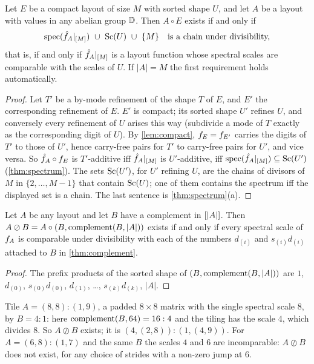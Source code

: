 \begin{theorem}\label{thm:division}
Let $E$ be a compact layout of size $M$ with sorted shape $U$, and let $A$ be a layout with values
in any abelian group $\mathbb{D}$. Then $A\circ E$ exists if and only if
\[ \operatorname{spec}(\hat{f}_{A}|_{[M]})\ \cup\ \operatorname{Sc}(U)\ \cup\ \{M\}\quad\text{is a chain under divisibility,} \]
that is, if and only if $\hat{f}_{A}|_{[M]}$ is a layout function whose spectral scales are
comparable with the scales of $U$. If $|A|=M$ the first requirement holds automatically.
\end{theorem}
\begin{proof}
Let $T'$ be a by-mode refinement of the shape $T$ of $E$, and $E'$ the corresponding refinement of
$E$. $E'$ is compact; its sorted shape $U'$ refines $U$, and conversely every refinement of $U$
arises this way (subdivide a mode of $T$ exactly as the corresponding digit of $U$). By
\cref{lem:compact}, $f_{E}=f_{E'}$ carries the digits of $T'$ to those of $U'$, hence
carry-free pairs for $T'$ to carry-free pairs for $U'$, and vice versa. So $\hat{f}_{A}\circ f_{E}$ is
$T'$-additive iff $\hat{f}_{A}|_{[M]}$ is $U'$-additive, iff
$\operatorname{spec}(\hat{f}_{A}|_{[M]})\subseteq\operatorname{Sc}(U')$ (\cref{thm:spectrum}). The sets $\operatorname{Sc}(U')$, for $U'$
refining $U$, are the chains of divisors of $M$ in $\{2,\dots,M-1\}$ that contain $\operatorname{Sc}(U)$; one
of them contains the spectrum iff the displayed set is a chain. The last sentence is
\cref{thm:spectrum}(a).
\end{proof}

\begin{corollary}\label{cor:divide}
Let $A$ be any layout and let $B$ have a complement in $[|A|]$. Then
$A\oslash B=A\circ(B,\operatorname{complement}(B,|A|))$ exists if and only if every spectral scale of $f_{A}$ is
comparable under divisibility with each of the numbers $d_{(i)}$ and $s_{(i)}d_{(i)}$ attached to
$B$ in \cref{thm:complement}.
\end{corollary}
\begin{proof}
The prefix products of the sorted shape of $(B,\operatorname{complement}(B,|A|))$ are
$1$, $d_{(0)}$, $s_{(0)}d_{(0)}$, $d_{(1)}$, \dots, $s_{(k)}d_{(k)}$, $|A|$.
\end{proof}

\begin{example}
Tile $A=(8,8):(1,9)$, a padded $8\times8$ matrix with the single spectral scale $8$, by $B=4:1$:
here $\operatorname{complement}(B,64)=16:4$ and the tiling has the scale $4$, which divides $8$. So
$A\oslash B$ exists; it is $(4,(2,8)):(1,(4,9))$. For $A=(6,8):(1,7)$ and the same $B$ the scales
$4$ and $6$ are incomparable: $A\oslash B$ does not exist, for any choice of strides with a
non-zero jump at $6$.
\end{example}

